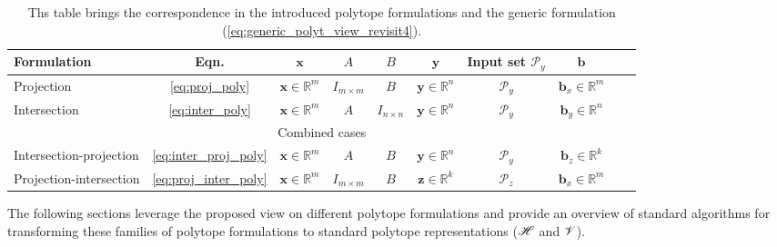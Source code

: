 \begin{table}[!h]
\centering
\begin{tabular}{|l|c|c|c|c|c|c|c|c|c|}
\hline
Formulation & Eqn. & $\bm{x}$ & $A$ & $B$ & $\bm{y}$ & Input set $\mathcal{P}_y$ & $\bm{b}$ \\
\hline
Projection & \ref{eq:proj_poly} & $\bm{x}\in\mathbb{R}^m$ & $I_{m\times m}$& $B$ & $\bm{y}\in\mathbb{R}^n$ & $\mathcal{P}_y$ & $\bm{b}_x\in\mathbb{R}^m$ \\
Intersection & \ref{eq:inter_poly} & $\bm{x}\in\mathbb{R}^m$ & $A$& $I_{n\times n}$ & $\bm{y}\in\mathbb{R}^n$ & $\mathcal{P}_y$ & $\bm{b}_y\in\mathbb{R}^n$ \\
\hline
\multicolumn{10}{c}{Combined cases} \\
\hline
Intersection-projection & \ref{eq:inter_proj_poly} & $\bm{x}\in\mathbb{R}^m$ & $A$& $B$ & $\bm{y}\in\mathbb{R}^n$ & $\mathcal{P}_y$ & $\bm{b}_z\in\mathbb{R}^k$ \\
Projection-intersection & \ref{eq:proj_inter_poly} & $\bm{x}\in\mathbb{R}^m$ & $I_{m\times m}$& $B$ & $\bm{z}\in\mathbb{R}^k$ & $\mathcal{P}_z$ & $\bm{b}_x\in\mathbb{R}^m$ \\
\hline
\end{tabular}
\caption{Ths table brings the correspondence in the introduced polytope formulations and the generic formulation (\ref{eq:generic_polyt_view_revisit4}). }
\label{tab:generic_formulations}
\end{table}

The following sections leverage the proposed view on different polytope formulations and provide an overview of standard algorithms for transforming these families of polytope formulations to standard polytope representations ($\mathscr{H}$ and $\mathscr{V}$). 


